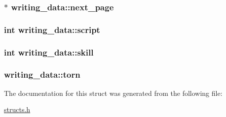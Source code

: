 \hypertarget{structwriting__data_ab39fee813d85da5295d94fd8ad12be33}{
\subsubsection[{next\-\_\-page}]{$\ast$ writing\-\_\-data\-::next\-\_\-page}}\label{structwriting__data_ab39fee813d85da5295d94fd8ad12be33}
\hypertarget{structwriting__data_a05f9528e28940d5de9e5f4c8387b5670}{
\subsubsection[{script}]{\setlength{\rightskip}{0pt plus 5cm}int writing\-\_\-data\-::script}}\label{structwriting__data_a05f9528e28940d5de9e5f4c8387b5670}
\hypertarget{structwriting__data_a8752da7cd404f940f5168e2f805d2de9}{
\subsubsection[{skill}]{\setlength{\rightskip}{0pt plus 5cm}int writing\-\_\-data\-::skill}}\label{structwriting__data_a8752da7cd404f940f5168e2f805d2de9}
\hypertarget{structwriting__data_afabab5b644ad0e669286c930131177a9}{
\subsubsection[{torn}]{ writing\-\_\-data\-::torn}}\label{structwriting__data_afabab5b644ad0e669286c930131177a9}


The documentation for this struct was generated from the following file\-:\begin{DoxyCompactItemize}
\item 
\hyperlink{structs_8h}{structs.\-h}\end{DoxyCompactItemize}
